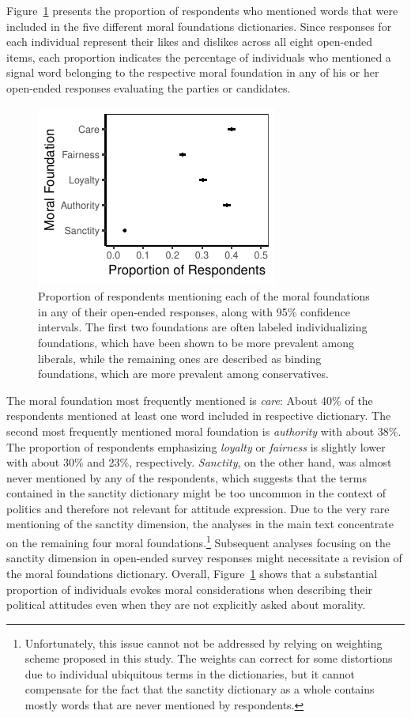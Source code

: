 \documentclass[12pt]{article}
\begin{document}
Figure~\ref{fig:prop_ideol} presents the proportion of respondents who mentioned words that were included in the five different moral foundations dictionaries. Since responses for each individual represent their likes and dislikes across all eight open-ended items, each proportion indicates the percentage of individuals who mentioned a signal word belonging to the respective moral foundation in any of his or her open-ended responses evaluating the parties or candidates.

\begin{figure}[ht]\centering
\includegraphics{../calc/fig/prop_mft.pdf}
\caption{Proportion of respondents mentioning each of the moral foundations in any of their open-ended responses, along with 95\% confidence intervals. The first two foundations are often labeled individualizing foundations, which have been shown to be more prevalent among liberals, while the remaining ones are described as binding foundations, which are more prevalent among conservatives.}\label{fig:prop_ideol}
\end{figure}

The moral foundation most frequently mentioned is \textit{care}: About 40\% of the respondents mentioned at least one word included in respective dictionary. The second most frequently mentioned moral foundation is \textit{authority} with about 38\%. The proportion of respondents emphasizing \textit{loyalty} or \textit{fairness} is slightly lower with about 30\% and 23\%, respectively. \textit{Sanctity}, on the other hand, was almost never mentioned by any of the respondents, which suggests that the terms contained in the sanctity dictionary might be too uncommon in the context of politics and therefore not relevant for attitude expression. Due to the very rare mentioning of the sanctity dimension, the analyses in the main text concentrate on the remaining four moral foundations.\footnote{Unfortunately, this issue cannot not be addressed by relying on weighting scheme proposed in this study. The weights can correct for some distortions due to individual ubiquitous terms in the dictionaries, but it cannot compensate for the fact that the sanctity dictionary as a whole contains mostly words that are never mentioned by respondents.} Subsequent analyses focusing on the sanctity dimension in open-ended survey responses might necessitate a revision of the moral foundations dictionary. Overall, Figure~\ref{fig:prop_ideol} shows that a substantial proportion of individuals evokes moral considerations when describing their political attitudes even when they are not explicitly asked about morality.
\end{document}
